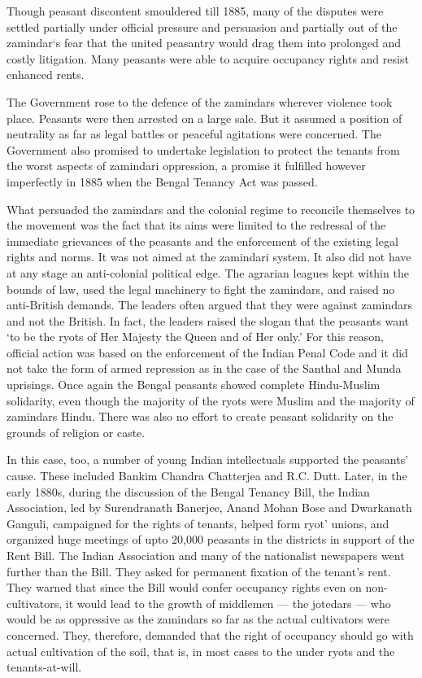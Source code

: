 Though peasant discontent smouldered till 1885, many of the disputes were settled partially under official pressure and persuasion and partially out of the zamindar`s fear that the united peasantry would drag them into prolonged and costly litigation. Many peasants were able to acquire occupancy rights and resist enhanced rents.

The Government rose to the defence of the zamindars wherever violence took place. Peasants were then arrested on a large sale. But it assumed a position of neutrality as far as legal battles or peaceful agitations were concerned. The Government also promised to undertake legislation to protect the tenants from the worst aspects of zamindari oppression, a promise it fulfilled however imperfectly in 1885 when the Bengal Tenancy Act was passed.

What persuaded the zamindars and the colonial regime to reconcile themselves to the movement was the fact that its aims were limited to the redressal of the immediate grievances of the peasants and the enforcement of the existing legal rights and norms. It was not aimed at the zamindari system. It also did not have at any stage an anti-colonial political edge. The agrarian leagues kept within the bounds of law, used the legal machinery to fight the zamindars, and raised no anti-British demands. The leaders often argued that they were against zamindars and not the British. In fact, the leaders raised the slogan that the peasants want `to be the ryots of Her Majesty the Queen and of Her only.' For this reason, official action was based on the enforcement of the Indian Penal Code and it did not take the form of armed repression as in the case of the Santhal and Munda uprisings. Once again the Bengal peasants showed complete Hindu-Muslim solidarity, even though the majority of the ryots were Muslim and the majority of zamindars Hindu. There was also no effort to create peasant solidarity on the grounds of religion or caste.

In this case, too, a number of young Indian intellectuals supported the peasants' cause. These included Bankim Chandra Chatterjea and R.C. Dutt. Later, in the early 1880s, during the discussion of the Bengal Tenancy Bill, the Indian Association, led by Surendranath Banerjee, Anand Mohan Bose and Dwarkanath Ganguli, campaigned for the rights of tenants, helped form ryot' unions, and organized huge meetings of upto 20,000 peasants in the districts in support of the Rent Bill. The Indian Association and many of the nationalist newspapers went further than the Bill. They asked for permanent fixation of the tenant's rent. They warned that since the Bill would confer occupancy rights even on non-cultivators, it would lead to the growth of middlemen — the jotedars — who would be as oppressive as the zamindars so far as the actual cultivators were concerned. They, therefore, demanded that the right of occupancy should go with actual cultivation of the soil, that is, in most cases to the under ryots and the tenants-at-will.


